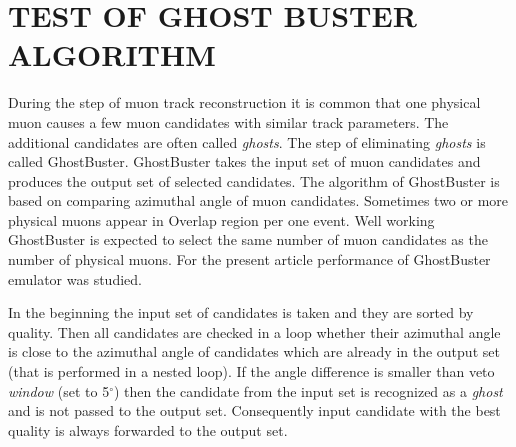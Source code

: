 \section{TEST OF GHOST BUSTER ALGORITHM}

During the step of muon track reconstruction it is common that one physical muon causes a few muon candidates with similar track parameters. The additional candidates are often called \textit{ghosts}. The step of eliminating \textit{ghosts} is called GhostBuster. GhostBuster takes the input set of muon candidates and produces the output set of selected candidates. The algorithm of GhostBuster is based on comparing azimuthal angle of muon candidates. Sometimes two or more physical muons appear in Overlap region per one event. Well working GhostBuster is expected to select the same number of muon candidates as the number of physical muons. For the present article performance of GhostBuster emulator was studied.

In the beginning the input set of candidates is taken and they are sorted by quality. Then all candidates are checked in a loop whether their azimuthal angle is close to the azimuthal angle of candidates which are already in the output set (that is performed in a nested loop). If the angle difference is smaller than veto \textit{window} (set to 5$^\circ$) then the candidate from the input set is recognized as a \textit{ghost} and is not passed to the output set. Consequently input candidate with the best quality is always forwarded to the output set.

